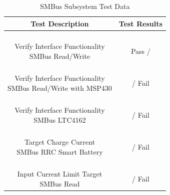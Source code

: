 \documentclass[12pt]{article}
\begin{document}
\begin{table}[h!]
\centering
\caption*{SMBus Subsystem Test Data}
\begin{tabular}{ | c | c | }
\hline
\textbf{Test Description} & \textbf{Test Results} \\
\hline
\parbox{0.5\linewidth}{\raggedright \hfill \\[-0.25 em]
Verify Interface Functionality\\
SMBus Read/Write
\hfill \\[0.1 em]} &  \parbox{0.4\linewidth}{\centering \hfill \\ [0.7 em] 
Pass \space /   \hfill \\ [0.3 em]} \\ 
\hline
\parbox{0.5\linewidth}{\raggedright \hfill \\[-0.25 em]
Verify Interface Functionality\\
SMBus Read/Write with MSP430
\hfill \\[0.1 em]} &  \parbox{0.4\linewidth}{\centering \hfill \\ [0.7 em] 
 / \space  Fail \hfill \\ [0.3 em]} \\ 
\hline
\parbox{0.5\linewidth}{\raggedright \hfill \\[-0.25 em]
Verify Interface Functionality\\
SMBus LTC4162
\hfill \\[0.1 em]} &  \parbox{0.4\linewidth}{\centering \hfill \\ [0.7 em] 
 / \space  Fail \hfill \\ [0.3 em]} \\ 
\hline
\parbox{0.5\linewidth}{\raggedright \hfill \\[-0.25 em]
Target Charge Current\\
SMBus RRC Smart Battery
\hfill \\[0.1 em]} &  \parbox{0.4\linewidth}{\centering \hfill \\ [0.7 em] 
 / \space  Fail \hfill \\ [0.3 em]} \\ 
\hline
\parbox{0.5\linewidth}{\raggedright \hfill \\[-0.25 em]
Input Current Limit Target\\
SMBus Read
\hfill \\[0.1 em]} &  \parbox{0.4\linewidth}{\centering \hfill \\ [0.7 em] 
 / \space  Fail \hfill \\ [0.3 em]} \\ 
\hline
\end{tabular}
\end{table}
\hfill \\
\pagebreak
\end{document}
